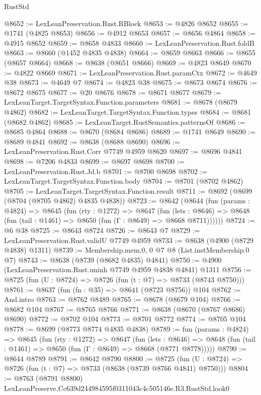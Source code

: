 \begin{lexlean}{RustStd}
\begin{coremodule}
@8652 := LexLeanPreservation.Rust.RBlock
@8653 := @4826 @8652
@8655 := @1741 (@4825 @8653)
@8656 := @4912 @8653
@8657 := @8656 @4864
@8658 := @4915 @8652
@8659 := @8658 @4833
@8660 := LexLeanPreservation.Rust.foldB
@8663 := @8660 (@1452 @4835 @4838)
@8664 := @8659 @8663
@8666 := @8655 (@8657 @8664)
@8668 := @8638 (@8651 @8666)
@8669 := @4823 @8649
@8670 := @4822 @8669
@8671 := LexLeanPreservation.Rust.paramCtx
@8672 := @4649 @38
@8673 := @4649 @7
@8674 := @4823 @38
@8675 := @8673 @8674
@8676 := @8672 @8675
@8677 := @20 @8676
@8678 := @8671 @8677
@8679 := LexLeanTarget.TargetSyntax.Function.parameters
@8681 := @8678 (@8679 @4862)
@8682 := LexLeanTarget.TargetSyntax.Function.types
@8684 := @8681 (@8682 @4862)
@8685 := LexLeanTarget.RustSemantics.patternsOf
@8686 := @8685 @4864
@8688 := @8670 (@8684 @8686)
@8689 := @1741 @8649
@8690 := @8689 @4841
@8692 := @8638 (@8688 @8690)
@8696 := LexLeanPreservation.Rust.Corr @7749 @4959 @8620
@8697 := @8696 @4841
@8698 := @7206 @4833
@8699 := @8697 @8698
@8700 := LexLeanPreservation.Rust.Jd.b
@8701 := @8700 @8698
@8702 := LexLeanTarget.TargetSyntax.Function.body
@8704 := @8701 (@8702 @4862)
@8705 := LexLeanTarget.TargetSyntax.Function.result
@8711 := @8692 (@8699 (@8704 (@8705 @4862) @4835 @4838))
@8723 := @8642
    (@8644
      (fun (params : @4824) =>
      @8645
        (fun (rty : @1272) =>
        @8647
          (fun (lets : @8646) =>
          @8648 (fun (tail : @1461) => @8650 (fun (Γ : @8649) => @8668 @8711))))))
@8724 := @6 @38
@8725 := @8643 @8724
@8726 := @8643 @7
@8729 := LexLeanPreservation.Rust.validU @7749 @4959
@8733 := @8638 (@4900 (@8729 @4838) @1311)
@8739 := Membership.mem.{0, 0} @7 @8 (List.instMembership.{0} @7)
@8743 := @8638 (@8739 (@8682 @4835) @4841)
@8750 := @4900 (LexLeanPreservation.Rust.uninh @7749 @4959 @4838 @4841) @1311
@8756 := @8725 (fun (U : @8724) => @8726 (fun (t : @7) => @8733 (@8743 @8750)))
@8761 := @8637 (fun (fn : @35) => @8641 (@8723 @8756)) @104
@8762 := And.intro
@8763 := @8762 @8489
@8765 := @8678 (@8679 @104)
@8766 := @8682 @104
@8767 := @8765 @8766
@8771 := @8638 (@8670 (@8767 @8686) @8690)
@8772 := @8702 @104
@8773 := @8701 @8772
@8774 := @8705 @104
@8778 := @8699 (@8773 @8774 @4835 @4838)
@8789 := fun (params : @4824) =>
  @8645
    (fun (rty : @1272) =>
    @8647
      (fun (lets : @8646) =>
      @8648 (fun (tail : @1461) => @8650 (fun (Γ : @8649) => @8668 (@8771 @8778)))))
@8790 := @8644 @8789
@8791 := @8642 @8790
@8800 := @8725 (fun (U : @8724) => @8726 (fun (t : @7) => @8733 (@8638 (@8739 @8766 @4841) @8750)))
@8804 := @8763 (@8791 @8800) LexLeanPreserve.Cc639d244984595f0311043c4c505146e.R3.RustStd.look0

\end{coremodule}
\end{lexlean}
